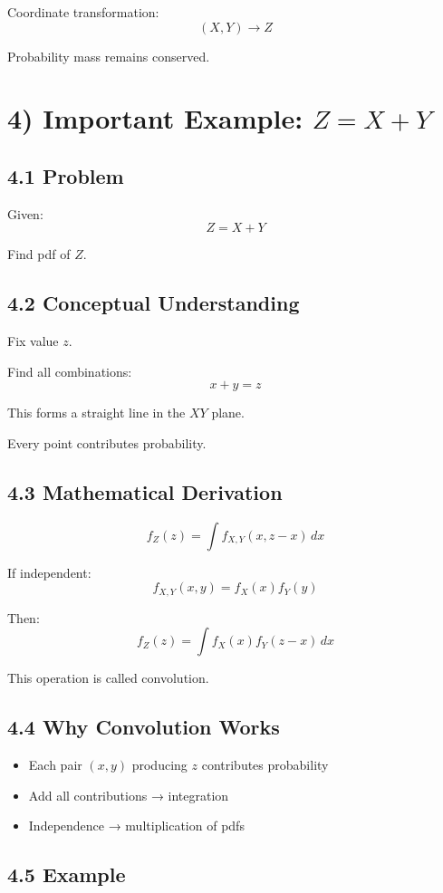 \documentclass[12pt,a4paper]{article}
\begin{document}
Coordinate transformation:
\[
(X,Y) \rightarrow Z
\]

Probability mass remains conserved.

\section*{4) Important Example: $Z = X + Y$}

\subsection*{4.1 Problem}

Given:
\[
Z = X + Y
\]

Find pdf of $Z$.

\subsection*{4.2 Conceptual Understanding}

Fix value $z$.

Find all combinations:
\[
x + y = z
\]

This forms a straight line in the $XY$ plane.

Every point contributes probability.

\subsection*{4.3 Mathematical Derivation}

\[
f_Z(z) = \int f_{X,Y}(x, z-x)\,dx
\]

If independent:
\[
f_{X,Y}(x,y) = f_X(x)f_Y(y)
\]

Then:
\[
f_Z(z) = \int f_X(x)f_Y(z-x)\,dx
\]

This operation is called convolution.

\subsection*{4.4 Why Convolution Works}

\begin{itemize}
\item Each pair $(x,y)$ producing $z$ contributes probability
\item Add all contributions → integration
\item Independence → multiplication of pdfs
\end{itemize}

\subsection*{4.5 Example}
\end{document}
